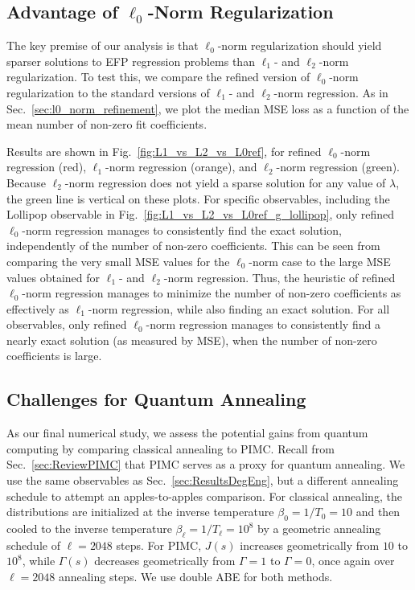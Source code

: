 \documentclass[aps,prd,twocolumn, superscriptaddress,preprintnumbers, nofootinbib,longbibliography,floatfix]{revtex4-2}
\DeclareRobustCommand{\Sec}[1]{Sec.~\ref{#1}}
\DeclareRobustCommand{\Fig}[1]{Fig.~\ref{#1}}
\begin{document}
\subsection{Advantage of $\ell_0$-Norm Regularization}
\label{sec:l0_norm_reg_num}

The key premise of our analysis is that $\ell_0$-norm regularization should yield sparser solutions to EFP regression problems than $\ell_1$- and $\ell_2$-norm regularization.
%
To test this, we compare the refined version of $\ell_0$-norm regularization to the standard versions of $\ell_1$- and $\ell_2$-norm regression.
%
As in \Sec{sec:l0_norm_refinement}, we plot the median MSE loss as a function of the mean number of non-zero fit coefficients.


Results are shown in \Fig{fig:L1_vs_L2_vs_L0ref}, for refined $\ell_0$-norm regression (red), $\ell_1$-norm regression (orange), and $\ell_2$-norm regression (green).
%
Because $\ell_2$-norm regression does not yield a sparse solution for any value of $\lambda$, the green line is vertical on these plots.
%
For specific observables, including the Lollipop observable in \Fig{fig:L1_vs_L2_vs_L0ref_g_lollipop}, only refined $\ell_0$-norm regression manages to consistently find the exact solution, independently of the number of non-zero coefficients.
%
This can be seen from comparing the very small MSE values for the $\ell_0$-norm case to the large MSE values obtained for $\ell_1$- and $\ell_2$-norm regression.
%
Thus, the heuristic of refined $\ell_0$-norm regression manages to minimize the number of non-zero coefficients as effectively as $\ell_1$-norm regression, while also finding an exact solution.
%
For all observables, only refined $\ell_0$-norm regression manages to consistently find a nearly exact solution (as measured by MSE), when the number of non-zero coefficients is large.


\subsection{Challenges for Quantum Annealing}
\label{sec:ResultsPIMC}

As our final numerical study, we assess the potential gains from quantum computing by comparing classical annealing to PIMC.
%
Recall from \Sec{sec:ReviewPIMC} that PIMC serves as a proxy for quantum annealing.
%
We use the same observables as \Sec{sec:ResultsDegEng}, but a different annealing schedule to attempt an apples-to-apples comparison.
%
For classical annealing, the distributions are initialized at the inverse temperature $\beta_0=1/T_0 = 10$ and then cooled to the inverse temperature $\beta_\ell=1/T_\ell = 10^{8}$ by a geometric annealing schedule of $\ell=2048$ steps.
%
For PIMC, $J(s)$  increases geometrically from $10$ to $10^8$, while $\Gamma(s)$ decreases geometrically from $\Gamma=1$ to $\Gamma=0$, once again over $\ell=2048$ annealing steps.
%
We use double ABE for both methods.
\end{document}
